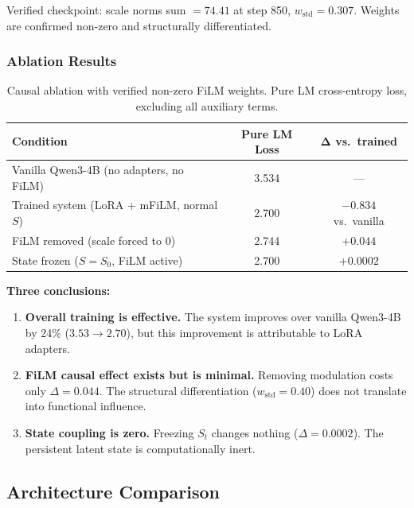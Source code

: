 \documentclass[11pt,a4paper]{article}
\newcommand{\St}{S_t}
\begin{document}
Verified checkpoint: scale norms sum $= 74.41$ at step 850,
$w_{\mathrm{std}} = 0.307$. Weights are confirmed non-zero and structurally
differentiated.

\subsubsection*{Ablation Results}

\begin{table}[h]
\centering
\begin{tabular}{lcc}
\toprule
\textbf{Condition} & \textbf{Pure LM Loss} & $\boldsymbol{\Delta}$ \textbf{vs.\ trained} \\
\midrule
Vanilla Qwen3-4B (no adapters, no FiLM) & 3.534 & --- \\
Trained system (LoRA + mFiLM, normal $S$) & 2.700 & $-0.834$ vs.\ vanilla \\
FiLM removed (scale forced to 0) & 2.744 & $+0.044$ \\
State frozen ($S = S_0$, FiLM active) & 2.700 & $+0.0002$ \\
\bottomrule
\end{tabular}
\caption{Causal ablation with verified non-zero FiLM weights. Pure LM
cross-entropy loss, excluding all auxiliary terms.}
\end{table}

\textbf{Three conclusions:}

\begin{enumerate}
  \item \textbf{Overall training is effective.} The system improves over vanilla
    Qwen3-4B by 24\% ($3.53 \to 2.70$), but this improvement is attributable to
    LoRA adapters.
  \item \textbf{FiLM causal effect exists but is minimal.} Removing modulation
    costs only $\Delta = 0.044$. The structural differentiation
    ($w_{\mathrm{std}} = 0.40$) does not translate into functional influence.
  \item \textbf{State coupling is zero.} Freezing $\St$ changes nothing
    ($\Delta = 0.0002$). The persistent latent state is computationally inert.
\end{enumerate}

\subsection{Architecture Comparison}
\end{document}

